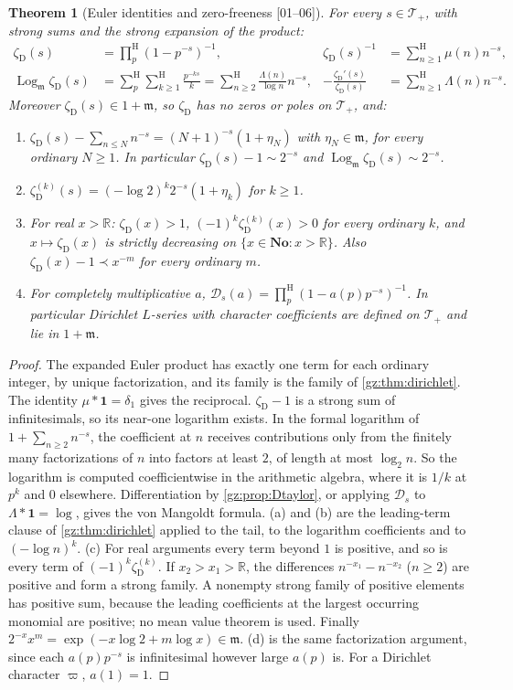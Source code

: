 \documentclass[11pt,a4paper]{article}
\numberwithin{equation}{section}
\newtheorem{theorem}{Theorem}[section]
\theoremstyle{definition}
\theoremstyle{remark}
\newcommand{\No}{\mathbf{No}}
\newcommand{\R}{\mathbb R}
\newcommand{\mm}{\mathfrak m}
\newcommand{\Lgm}{\operatorname{Log}_{\mm}}
\newcommand{\Sh}{\mathop{\textstyle\sum}\nolimits^{\mathrm H}}
\newcommand{\Ph}{\mathop{\textstyle\prod}\nolimits^{\mathrm H}}
\newcommand{\zD}{\zeta_{\mathrm D}}
\newcommand{\DD}{\mathcal D}
\newcommand{\Tp}{\mathcal T_{+}}
\newcommand{\src}[1]{\textup{[#1]}}
\begin{document}
\begin{theorem}[Euler identities and zero-freeness \src{01--06}]\label{gz:thm:euler}
For every $s\in\Tp$, with strong sums and the strong expansion of the
product:
\begin{align*}
\zD(s)&=\Ph_p(1-p^{-s})^{-1},&\zD(s)^{-1}&=\Sh_{n\ge1}\mu(n)n^{-s},\\
\Lgm\zD(s)&=\Sh_p\Sh_{k\ge1}\frac{p^{-ks}}k=\Sh_{n\ge2}\frac{\Lambda(n)}{\log n}n^{-s},&
-\frac{\zD'(s)}{\zD(s)}&=\Sh_{n\ge1}\Lambda(n)n^{-s}.
\end{align*}
Moreover $\zD(s)\in1+\mm$, so $\zD$ has no zeros or poles on $\Tp$, and:
\begin{enumerate}[label=(\alph*)]
\item $\zD(s)-\sum_{n\le N}n^{-s}=(N+1)^{-s}(1+\eta_N)$ with $\eta_N\in\mm$,
 for every ordinary $N\ge1$. In particular $\zD(s)-1\sim2^{-s}$ and
 $\Lgm\zD(s)\sim2^{-s}$.
\item $\zD^{(k)}(s)=(-\log2)^k2^{-s}(1+\eta_k)$ for $k\ge1$.
\item For real $x>\R$: $\zD(x)>1$, $(-1)^k\zD^{(k)}(x)>0$ for every
 ordinary $k$, and $x\mapsto\zD(x)$ is strictly decreasing on
 $\{x\in\No:x>\R\}$. Also $\zD(x)-1\prec x^{-m}$ for every ordinary $m$.
\item For completely multiplicative $a$, $\DD_s(a)=\Ph_p(1-a(p)p^{-s})^{-1}$.
 In particular Dirichlet $L$-series with character coefficients are defined
 on $\Tp$ and lie in $1+\mm$.
\end{enumerate}
\end{theorem}
\begin{proof}
The expanded Euler product has exactly one term for each ordinary integer,
by unique factorization, and its family is the family of
\cref{gz:thm:dirichlet}. The identity $\mu*\mathbf1=\delta_1$ gives the
reciprocal. $\zD-1$ is a strong sum of infinitesimals, so its near-one
logarithm exists. In the formal logarithm of $1+\sum_{n\ge2}n^{-s}$, the
coefficient at $n$ receives contributions only from the finitely many
factorizations of $n$ into factors at least $2$, of length at most
$\log_2n$. So the logarithm is computed coefficientwise in the arithmetic
algebra, where it is $1/k$ at $p^k$ and $0$ elsewhere. Differentiation by
\cref{gz:prop:Dtaylor}, or applying $\DD_s$ to $\Lambda*\mathbf1=\log$,
gives the von Mangoldt formula. (a) and (b) are the leading-term clause of
\cref{gz:thm:dirichlet} applied to the tail, to the logarithm coefficients
and to $(-\log n)^k$. (c) For real arguments every term beyond $1$ is
positive, and so is every term of $(-1)^k\zD^{(k)}$. If $x_2>x_1>\R$, the
differences $n^{-x_1}-n^{-x_2}$ ($n\ge2$) are positive and form a strong
family. A nonempty strong family of positive elements has positive sum,
because the leading coefficients at the largest occurring monomial are
positive; no mean value theorem is used. Finally
$2^{-x}x^m=\exp(-x\log2+m\log x)\in\mm$. (d) is the same factorization
argument, since each $a(p)p^{-s}$ is infinitesimal however large $a(p)$
is. For a Dirichlet character $\varpi$, $a(1)=1$.
\end{proof}
\end{document}
